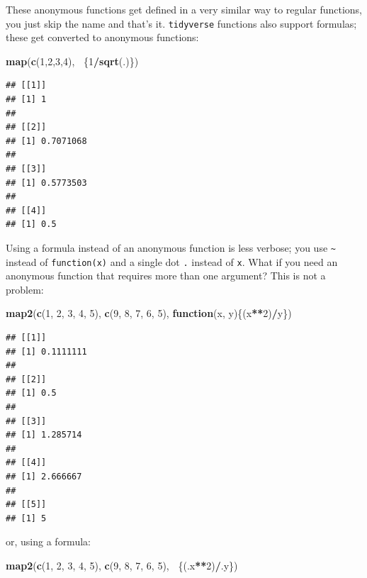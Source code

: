 \documentclass[]{gitbook}
\newenvironment{Shaded}{\begin{snugshade}}{\end{snugshade}}
\newcommand{\ControlFlowTok}[1]{\textcolor[rgb]{0.13,0.29,0.53}{\textbf{#1}}}
\newcommand{\DecValTok}[1]{\textcolor[rgb]{0.00,0.00,0.81}{#1}}
\newcommand{\KeywordTok}[1]{\textcolor[rgb]{0.13,0.29,0.53}{\textbf{#1}}}
\newcommand{\NormalTok}[1]{#1}
\newcommand{\OperatorTok}[1]{\textcolor[rgb]{0.81,0.36,0.00}{\textbf{#1}}}
\theoremstyle{definition}
\theoremstyle{definition}
\theoremstyle{definition}
\theoremstyle{remark}
\begin{document}
These anonymous functions get defined in a very similar way to regular
functions, you just skip the name and that's it. \texttt{tidyverse}
functions also support formulas; these get converted to anonymous
functions:

\begin{Shaded}
\begin{Highlighting}[]
\KeywordTok{map}\NormalTok{(}\KeywordTok{c}\NormalTok{(}\DecValTok{1}\NormalTok{,}\DecValTok{2}\NormalTok{,}\DecValTok{3}\NormalTok{,}\DecValTok{4}\NormalTok{), }\OperatorTok{~}\NormalTok{\{}\DecValTok{1}\OperatorTok{/}\KeywordTok{sqrt}\NormalTok{(.)\})}
\end{Highlighting}
\end{Shaded}

\begin{verbatim}
## [[1]]
## [1] 1
## 
## [[2]]
## [1] 0.7071068
## 
## [[3]]
## [1] 0.5773503
## 
## [[4]]
## [1] 0.5
\end{verbatim}

Using a formula instead of an anonymous function is less verbose; you
use \texttt{\textasciitilde{}} instead of \texttt{function(x)} and a
single dot \texttt{.} instead of \texttt{x}. What if you need an
anonymous function that requires more than one argument? This is not a
problem:

\begin{Shaded}
\begin{Highlighting}[]
\KeywordTok{map2}\NormalTok{(}\KeywordTok{c}\NormalTok{(}\DecValTok{1}\NormalTok{, }\DecValTok{2}\NormalTok{, }\DecValTok{3}\NormalTok{, }\DecValTok{4}\NormalTok{, }\DecValTok{5}\NormalTok{), }\KeywordTok{c}\NormalTok{(}\DecValTok{9}\NormalTok{, }\DecValTok{8}\NormalTok{, }\DecValTok{7}\NormalTok{, }\DecValTok{6}\NormalTok{, }\DecValTok{5}\NormalTok{), }\ControlFlowTok{function}\NormalTok{(x, y)\{(x}\OperatorTok{**}\DecValTok{2}\NormalTok{)}\OperatorTok{/}\NormalTok{y\})}
\end{Highlighting}
\end{Shaded}

\begin{verbatim}
## [[1]]
## [1] 0.1111111
## 
## [[2]]
## [1] 0.5
## 
## [[3]]
## [1] 1.285714
## 
## [[4]]
## [1] 2.666667
## 
## [[5]]
## [1] 5
\end{verbatim}

or, using a formula:

\begin{Shaded}
\begin{Highlighting}[]
\KeywordTok{map2}\NormalTok{(}\KeywordTok{c}\NormalTok{(}\DecValTok{1}\NormalTok{, }\DecValTok{2}\NormalTok{, }\DecValTok{3}\NormalTok{, }\DecValTok{4}\NormalTok{, }\DecValTok{5}\NormalTok{), }\KeywordTok{c}\NormalTok{(}\DecValTok{9}\NormalTok{, }\DecValTok{8}\NormalTok{, }\DecValTok{7}\NormalTok{, }\DecValTok{6}\NormalTok{, }\DecValTok{5}\NormalTok{), }\OperatorTok{~}\NormalTok{\{(.x}\OperatorTok{**}\DecValTok{2}\NormalTok{)}\OperatorTok{/}\NormalTok{.y\})}
\end{Highlighting}
\end{Shaded}
\end{document}
